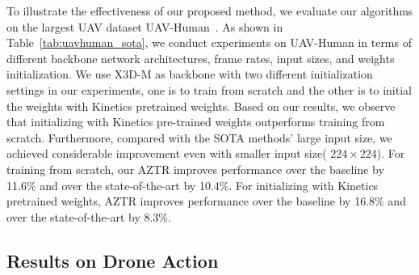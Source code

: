 \documentclass[letterpaper, 10 pt, conference]{ieeeconf}
\begin{document}
\begin{table}
\end{table} To illustrate the effectiveness of our proposed method, we evaluate our algorithms on the largest UAV dataset UAV-Human~\cite{li2021uav}. As shown in Table~\ref{tab:uavhuman_sota}, we conduct experiments on UAV-Human in terms of different backbone network architectures, frame rates, input sizes, and weights initialization. We use X3D-M as backbone with two different initialization settings in our experiments, one is to train from scratch and the other is to initial the weights with Kinetics pretrained weights. Based on our results, we observe that initializing with Kinetics pre-trained weights outperforms training from scratch. Furthermore, compared with the SOTA methods' large input size, we achieved considerable improvement even with smaller input size( $224\times 224$). For training from scratch, our AZTR improves performance over the baseline by 11.6\% and over the state-of-the-art by 10.4\%. For initializing with Kinetics pretrained weights, AZTR improves performance over the baseline by 16.8\% and over the state-of-the-art by 8.3\%. 


\subsection{Results on Drone Action}
\begin{table}
\centering
{}
\caption{Results on dataset: Drone Action. We demonstrate that AZTR improves the state-of-the-art accuracy by 3.2\%, reaching 95.9\% on Drone Action. Trained on high-end desktop GPUs.}
\vspace{-10pt}
\label{tab:more_drones}
\end{table}
 
\end{document}
